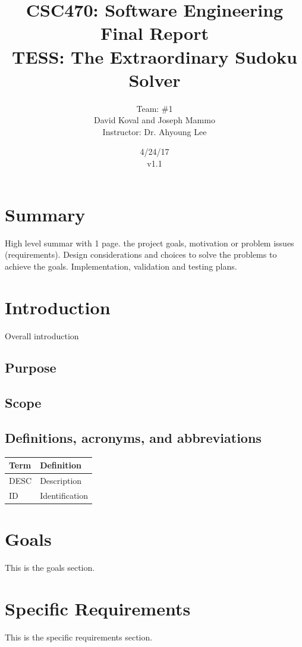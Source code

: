 \documentclass{article}
\title{CSC470: Software Engineering Final Report\\ TESS: The Extraordinary Sudoku Solver}
\author{Team: \#1 \\David Koval and Joseph Mammo\\Instructor: Dr. Ahyoung Lee}
\date{ 4/24/17 \\ v1.1 }
\begin{document}
 
\maketitle

\clearpage

\tableofcontents

\clearpage

\section{Summary} 
\todo{!!!} High level summar with 1 page. the project goals, motivation or problem issues (requirements). Design considerations and choices to solve the problems to achieve the goals. Implementation, validation and testing plans.


 
\section{Introduction}
 
Overall introduction
\subsection{Purpose}
\subsection{Scope}
\subsection{Definitions, acronyms, and abbreviations}

\begin{tabular}{ | m{8em} | m{24em}|  } 
\hline
\textbf{Term}& \textbf{Definition}  \\ 
\hline
DESC & Description  \\ 
\hline
ID & Identification  \\ 
\hline
\end{tabular}

 

\section{Goals}

This is the goals section. 


 
\section{Specific Requirements}
This is the specific requirements section.
\end{document}
